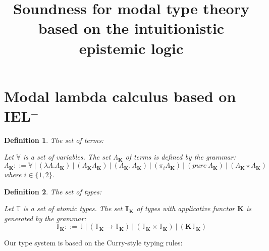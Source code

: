 \documentclass[a4paper]{article}
\date{}
\title{Soundness for modal type theory based on the intuitionistic epistemic logic}
\newtheorem{defin}{Definition}
\begin{document}
\maketitle

\section{Modal lambda calculus based on IEL$^{-}$}

\begin{defin} The set of terms:

Let $\mathbb{V}$ is a set of variables. The set $\Lambda_{\textbf{K}}$ of terms is defined by the grammar:
\begin{equation}
  \Lambda_{\textbf{K}} ::= \mathbb{V} \: | \:  (\lambda \Lambda.\Lambda_{\textbf{K}}) \: | \:
  (\Lambda_{\textbf{K}}\Lambda_{\textbf{K}}) \: | \: (\Lambda_{\textbf{K}} , \Lambda_{\textbf{K}}) \: | \:
  (\pi_i \Lambda_{\textbf{K}}) \:
  | \: (pure \: \Lambda_{\textbf{K}}) \: | \: (\Lambda_{\textbf{K}} \star
  \Lambda_{\textbf{K}})
\end{equation}
where $i \in \{ 1, 2 \}$.
\end{defin}

\begin{defin} The set of types:

Let $\mathbb{T}$ is a set of atomic types. The set $\mathbb{T}_{\textbf{K}}$ of types with applicative
functor
$\textbf{K}$ is generated by the grammar:
\begin{equation}
  \mathbb{T}_{\textbf{K}} ::= \mathbb{T} \: | \: (\mathbb{T}_{\textbf{K}} \to \mathbb{T}_{\textbf{K}}) \: |
  \:
  (\mathbb{T}_{\textbf{K}} \times \mathbb{T}_{\textbf{K}}) \: | \: (\textbf{K}\mathbb{T}_{\textbf{K}})
\end{equation}
\end{defin}

Our type system is based on the Curry-style typing rules:
\end{document}
